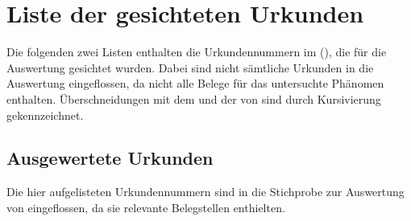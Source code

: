 \chapter{Liste der gesichteten Urkunden}
\label{sec:urkliste}

Die folgenden zwei Listen enthalten die Urkundennummern im  (\CAO), die für die Auswertung gesichtet wurden.
Dabei sind nicht sämtliche Urkunden in die Auswertung eingeflossen, da nicht
alle Belege für das untersuchte Phänomen enthalten. Überschneidungen mit dem
\REM{} und der  von \citet{ksw3,ksw2} sind
durch Kursivierung gekennzeichnet.

\section{Ausgewertete Urkunden}
\label{subsec:ausgewurk}

Die hier aufgelisteten Urkundennummern sind in die Stichprobe zur Auswertung von
 eingeflossen, da sie relevante Belegstellen enthielten.

